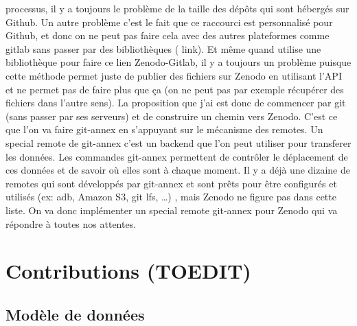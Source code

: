 \documentclass[11pt]{article}
\begin{document}
processus, il y a toujours le problème de la taille des dépôts qui
sont hébergés sur Github. Un autre problème c’est le fait que ce
raccourci est personnalisé pour Github, et donc on ne peut pas faire
cela avec des autres plateformes comme gitlab sans passer par des
bibliothèques ( link). Et même quand utilise une bibliothèque pour
faire ce lien Zenodo-Gitlab, il y a toujours un problème puisque cette
méthode permet juste de publier des fichiers sur Zenodo en utilisant
l'API et ne permet pas de faire plus que ça (on ne peut pas par
exemple récupérer des fichiers dans l’autre sens).
La proposition que j’ai est donc de commencer par git (sans passer par
ses serveurs) et de construire un chemin vers Zenodo. C’est ce que
l’on va faire git-annex en s’appuyant sur le mécanisme des remotes. Un
special remote de git-annex c’est un backend que l’on peut utiliser
pour transferer les données. Les commandes git-annex permettent de
contrôler le déplacement de ces données et de savoir où elles sont à
chaque moment. Il y a déjà une dizaine de remotes qui sont développés
par git-annex et sont prêts pour être configurés et utilisés (ex: adb,
Amazon S3, git lfs, …) , mais Zenodo ne figure pas dans cette
liste. On va donc implémenter un special remote git-annex pour Zenodo
qui va répondre à toutes nos attentes.

\section{Contributions (TOEDIT)}
\label{sec:org298c094}
\subsection{Modèle de données}
\label{sec:org78aa685}
\end{document}

